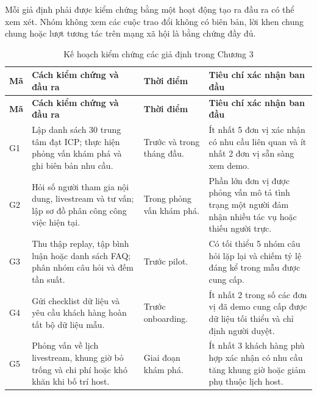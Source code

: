 Mỗi giả định phải được kiểm chứng bằng một hoạt động tạo ra đầu ra có thể xem xét. Nhóm không xem các cuộc trao đổi không có biên bản, lời khen chung chung hoặc lượt tương tác trên mạng xã hội là bằng chứng đầy đủ.

\begin{longtable}{
    p{}
    p{}
    p{}
    p{}
}
    \caption{Kế hoạch kiểm chứng các giả định trong Chương 3}
    \label{tab:assumption-validation-plan} \\
    \hline
    \textbf{Mã}
    & \textbf{Cách kiểm chứng và đầu ra}
    & \textbf{Thời điểm}
    & \textbf{Tiêu chí xác nhận ban đầu} \\
    \hline
    \endfirsthead

    \hline
    \textbf{Mã}
    & \textbf{Cách kiểm chứng và đầu ra}
    & \textbf{Thời điểm}
    & \textbf{Tiêu chí xác nhận ban đầu} \\
    \hline
    \endhead

    G1
    &
    Lập danh sách 30 trung tâm đạt ICP; thực hiện phỏng vấn khám phá và ghi biên bản nhu cầu.
    &
    Trước và trong tháng đầu.
    &
    Ít nhất 5 đơn vị xác nhận có nhu cầu liên quan và ít nhất 2 đơn vị sẵn sàng xem demo. \\

    \hline

    G2
    &
    Hỏi số người tham gia nội dung, livestream và tư vấn; lập sơ đồ phân công công việc hiện tại.
    &
    Trong phỏng vấn khám phá.
    &
    Phần lớn đơn vị được phỏng vấn mô tả tình trạng một người đảm nhận nhiều tác vụ hoặc thiếu người trực. \\

    \hline

    G3
    &
    Thu thập replay, tập bình luận hoặc danh sách FAQ; phân nhóm câu hỏi và đếm tần suất.
    &
    Trước pilot.
    &
    Có tối thiểu 5 nhóm câu hỏi lặp lại và chiếm tỷ lệ đáng kể trong mẫu được cung cấp. \\

    \hline

    G4
    &
    Gửi checklist dữ liệu và yêu cầu khách hàng hoàn tất bộ dữ liệu mẫu.
    &
    Trước onboarding.
    &
    Ít nhất 2 trong số các đơn vị đã demo cung cấp được dữ liệu tối thiểu và chỉ định người duyệt. \\

    \hline

    G5
    &
    Phỏng vấn về lịch livestream, khung giờ bỏ trống và chi phí hoặc khó khăn khi bố trí host.
    &
    Giai đoạn khám phá.
    &
    Ít nhất 3 khách hàng phù hợp xác nhận có nhu cầu tăng khung giờ hoặc giảm phụ thuộc lịch host. \\


\end{longtable}
